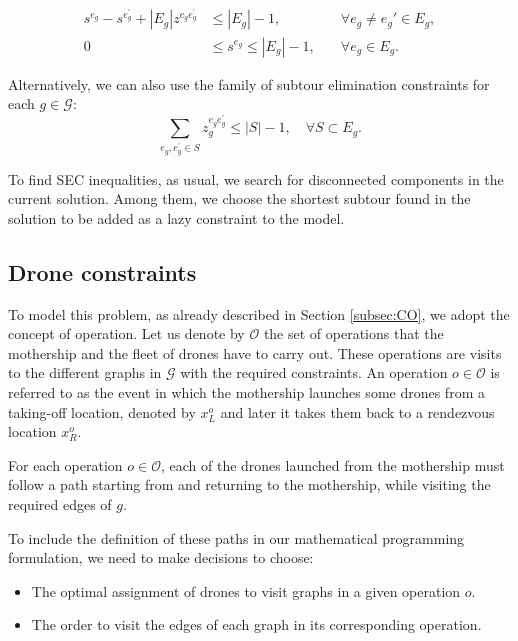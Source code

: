 \documentclass[10pt,a4paper]{elsarticle}
\newcommand{\EN}[1]{{\color{black}#1}}
\begin{document}
\begin{align}
	s^{e_g} - s^{e^\prime_g} + |E_g|z^{e_ge^\prime_g} & \leq |E_g| - 1  , &\quad\forall e_g \neq e_g'\in E_g, \tag{MTZ$_1$} \label{NOMTZ1}\\
	0 & \leq s^{e_g} \leq |E_g| - 1, &\quad\forall e_g\in E_g.\tag{MTZ$_2$}\label{NOMTZ2}
\end{align}

\noindent
Alternatively, we can also use the family of subtour elimination constraints for each $g\in\mathcal G$:
\begin{equation}\tag{SEC}\label{NOSEC}
	\sum_{e_g, e^\prime_g \in S} z_g^{e_ge^\prime_g} \leq |S| - 1, \quad \forall S\subset E_g.
\end{equation}

\noindent
To find SEC inequalities, as usual, we search for disconnected components in the current solution. Among them, we choose the shortest subtour found in the solution to be added as a lazy constraint to the model.\\

\subsection*{Drone constraints}
\noindent
To model this problem, as already described in Section \ref{subsec:CO}, we adopt the concept of operation.
Let us denote by $\mathcal O$ the set of operations that the mothership and the fleet of drones have to carry out. These operations are visits to the different graphs in $\mathcal G$ with the required constraints. An operation $o\in\mathcal O$ is referred to as the event in which the mothership launches some drones from a taking-off location, denoted by $x_L^o$ and later it takes them back \EN{to} a rendezvous location $x_R^o$. 

\noindent
For each operation $o\in\mathcal O$, each of the drones launched from the mothership must follow a path starting from and returning to the mothership, while visiting the required edges of $g$.





\noindent
To include the definition of these paths in our mathematical programming formulation, we need to make decisions to choose:
\begin{itemize}
	\item The optimal assignment of drones \EN{to visit} graphs in a given operation $o$.
	\item The order to visit the edges of each graph in its corresponding operation.
\end{itemize}
\end{document}
